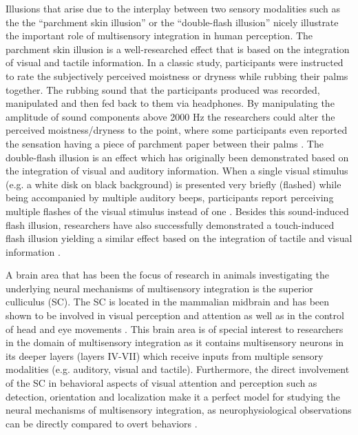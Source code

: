 \documentclass[12pt]{article}
\begin{document}
\par Illusions that arise due to the interplay between two sensory modalities such as the the “parchment skin illusion” \parencite{jousmaki_parchment-skin_1998} or the “double-flash illusion” \parencite{lange_perception_2011, shams_illusions:_2000, violentyev_touch-induced_2005} nicely illustrate the important role of multisensory integration in human perception. The parchment skin illusion is a well-researched effect that is based on the integration of visual and tactile information. In a classic study, participants were instructed to rate the subjectively perceived moistness or dryness while rubbing their palms together. The rubbing sound that the participants produced was recorded, manipulated and then fed back to them via headphones. By manipulating the amplitude of sound components above 2000 Hz the researchers could alter the perceived moistness/dryness to the point, where some participants even reported the sensation having a piece of parchment paper between their palms \parencite{jousmaki_parchment-skin_1998}. The double-flash illusion is an effect which has originally been demonstrated based on the integration of visual and auditory information. When a single visual stimulus (e.g. a white disk on black background) is presented very briefly (flashed) while being accompanied by multiple auditory beeps, participants report perceiving multiple flashes of the visual stimulus instead of one \parencite{shams_illusions:_2000}. Besides this sound-induced flash illusion, researchers have  also successfully demonstrated a touch-induced flash illusion yielding a similar effect based on the integration of tactile and visual information \parencite{lange_perception_2011,violentyev_touch-induced_2005}. 
%
\par A brain area that has been the focus of research in animals investigating the underlying neural mechanisms of multisensory integration is the superior culliculus (SC). The SC is located in the mammalian midbrain and has been shown to be involved in visual perception and attention as well as in the control of head and eye movements \parencite{sprague_role_1965}. This brain area is of special interest to researchers in the domain of multisensory integration as it contains multisensory neurons in its deeper layers (layers IV-VII) which receive inputs from multiple sensory modalities (e.g. auditory, visual and tactile)\parencite{stein_merging_1993,wallace_converging_1993}. Furthermore, the direct involvement of the SC in behavioral aspects of visual attention and perception such as detection, orientation and localization make it a perfect model for studying the neural mechanisms of multisensory integration, as neurophysiological observations can be directly compared to overt behaviors \parencite{bell_crossmodal_2005,burnett_superior_2004,jiang_two_2002,stein_behavioral_1989}. 
\end{document}
